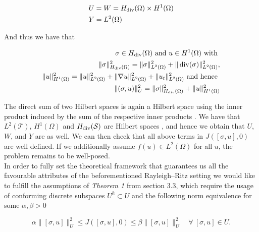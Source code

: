 \documentclass[../draft_1.tex]{subfiles}
\begin{document}
\begin{ceqn}
	\begin{align}
    & U = W = H_{\mathop{}\!\mathrm{div}}(\Omega) \times H^1(\Omega) \\
    & Y = L^2(\Omega)
	\end{align}
\end{ceqn}
 And thus we have that
\begin{ceqn}

	\begin{align}
	\label{spacesLS}
	\sigma \in H_{\mathop{}\!\mathrm{div}}(\Omega) \text{  and  } u \in H^1(\Omega) \text { with } \\
	\| \sigma \|_{H_{\mathop{}\!\mathrm{div}}(\Omega)}^2 = \| \sigma \|_{L^2(\Omega)}^2 + \| \mathop{}\!\mathrm{div}(\sigma) \|_{L^2(\Omega)}^2, \\
	 \|u \|_{H^1(\Omega)}^2 = \| u \|_{L^2(\Omega)}^2 + \| \nabla u \|_{L^2(\Omega)}^2 + \| u_t \|_{L^2(\Omega)}^2 \text{ and hence } \\
	 \| (\sigma, u) \|_U^2 = \| \sigma \|_{H_{\mathop{}\!\mathrm{div}}(\Omega)}^2 + \| u \|_{H^1(\Omega)}^2 \\
	\end{align}

\end{ceqn}
The direct sum of two Hilbert spaces is again a Hilbert space using the inner product induced by the sum of the respective inner products \cite{conway2013course}. We have that $L^2(\mathcal{T})$, $H^1(\Omega)$ and $H_{\mathop{}\!\mathrm{div}}(\mathcal{S})$ are Hilbert spaces \cite{tartar2007introduction}, and hence we obtain that $U$, $W$, and $Y$ are as well. We can then check that all above terms in $J([\sigma, u], 0)$ are well defined. If we additionally assume $f(u) \in L^2(\Omega)$ for all $u$, the problem remains to be well-posed. %
\smallskip
\\
In order to fully set the theoretical framework that guarantees us all the favourable attributes of the beforementioned Rayleigh--Ritz setting we would like to fulfill the assumptions of \textit{Theorem 1} from section 3.3, which require the usage of conforming discrete subspaces $U^h \subset U$ and the following norm equivalence for some $\alpha, \beta > 0$
\begin{ceqn}
	\begin{equation}
	\alpha \|[\sigma, u]\|_U^2 \leq J([\sigma, u], 0) \leq \beta \|[\sigma, u]\|_U^2  \quad \forall \  [\sigma, u] \in U.
	\end{equation}
\end{ceqn}
\end{document}

